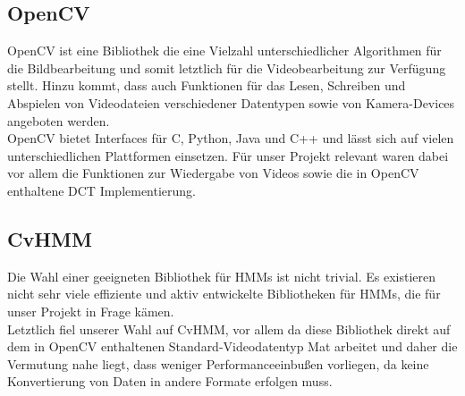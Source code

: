 \subsection{OpenCV}
\label{sec:opencv}
OpenCV ist eine Bibliothek die eine Vielzahl unterschiedlicher Algorithmen für die Bildbearbeitung und somit letztlich für die Videobearbeitung zur Verfügung stellt.
 Hinzu kommt, dass auch Funktionen für das Lesen, Schreiben und Abspielen von Videodateien verschiedener Datentypen sowie von Kamera-Devices angeboten werden.\\
OpenCV bietet Interfaces für C, Python, Java und C++ und lässt sich auf vielen unterschiedlichen Plattformen einsetzen.
 Für unser Projekt relevant waren dabei vor allem die Funktionen zur Wiedergabe von Videos sowie die in OpenCV enthaltene DCT Implementierung.


\subsection{CvHMM}
\label{sec:cvhmm}
Die Wahl einer geeigneten Bibliothek für HMMs ist nicht trivial.
 Es existieren nicht sehr viele effiziente und aktiv entwickelte Bibliotheken für HMMs, die für unser Projekt in Frage kämen.\\
Letztlich fiel unserer Wahl auf CvHMM, vor allem da diese Bibliothek direkt auf dem in OpenCV enthaltenen Standard-Videodatentyp Mat arbeitet und daher die Vermutung nahe liegt, dass weniger Performanceeinbußen vorliegen, da keine Konvertierung von Daten in andere Formate erfolgen muss.\\


